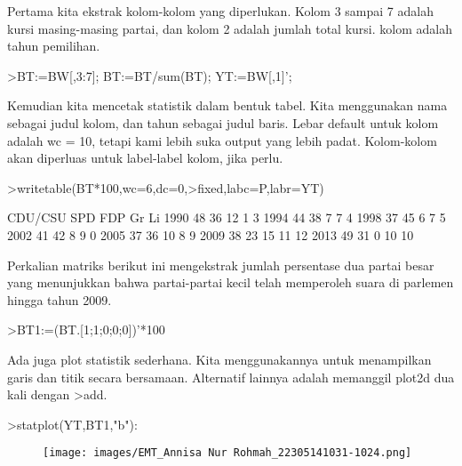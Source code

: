 \documentclass[a4paper,10pt]{article}
\begin{document}
\begin{eulernotebook}
\begin{eulercomment}
\begin{eulercomment}
\begin{eulercomment}
\begin{eulercomment}
\begin{eulercomment}
Pertama kita ekstrak kolom-kolom yang diperlukan. Kolom 3 sampai 7
adalah kursi masing-masing partai, dan kolom 2 adalah jumlah total
kursi. kolom adalah tahun pemilihan.
\end{eulercomment}
\begin{eulerprompt}
>BT:=BW[,3:7]; BT:=BT/sum(BT); YT:=BW[,1]';
\end{eulerprompt}
\begin{eulercomment}
Kemudian kita mencetak statistik dalam bentuk tabel. Kita menggunakan
nama sebagai judul kolom, dan tahun sebagai judul baris. Lebar default
untuk kolom adalah wc = 10, tetapi kami lebih suka output yang lebih
padat. Kolom-kolom akan diperluas untuk label-label kolom, jika perlu.
\end{eulercomment}
\begin{eulerprompt}
>writetable(BT*100,wc=6,dc=0,>fixed,labc=P,labr=YT)
\end{eulerprompt}
\begin{euleroutput}
         CDU/CSU   SPD   FDP    Gr    Li
    1990      48    36    12     1     3
    1994      44    38     7     7     4
    1998      37    45     6     7     5
    2002      41    42     8     9     0
    2005      37    36    10     8     9
    2009      38    23    15    11    12
    2013      49    31     0    10    10
\end{euleroutput}
\begin{eulercomment}
Perkalian matriks berikut ini mengekstrak jumlah persentase dua partai
besar yang menunjukkan bahwa partai-partai kecil telah memperoleh
suara di parlemen hingga tahun 2009.
\end{eulercomment}
\begin{eulerprompt}
>BT1:=(BT.[1;1;0;0;0])'*100
\end{eulerprompt}
\begin{euleroutput}
  [84.29,  81.25,  81.1659,  82.7529,  72.9642,  61.8971,  79.8732]
\end{euleroutput}
\begin{eulercomment}
Ada juga plot statistik sederhana. Kita menggunakannya untuk
menampilkan garis dan titik secara bersamaan. Alternatif lainnya
adalah memanggil plot2d dua kali dengan \textgreater{}add.
\end{eulercomment}
\begin{eulerprompt}
>statplot(YT,BT1,"b"):
\end{eulerprompt}
\begin{figure}[h]
    \centering
    \texttt{[image: images/EMT\_Annisa Nur Rohmah\_22305141031-1024.png]}

\end{figure}
\end{eulercomment}
\end{eulercomment}
\end{eulercomment}
\end{eulercomment}
\end{eulernotebook}
\end{document}
